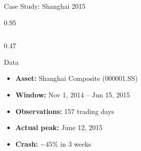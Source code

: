 \documentclass[9pt, aspectratio=169, t]{beamer}
\begin{document}
\begin{frame}{Case Study: Shanghai 2015}
    \begin{cminipage}{0.95\textwidth}
    {\footnotesize
    \begin{columns}[T]
        \begin{column}{0.47\textwidth}
            \begin{block}{Data}
                \begin{itemize}\setlength{\itemsep}{0pt}
                    \item \textbf{Asset:} Shanghai Composite (000001.SS)
                    \item \textbf{Window:} Nov 1, 2014 -- Jun 15, 2015
                    \item \textbf{Observations:} 157 trading days
                    \item \textbf{Actual peak:} June 12, 2015
                    \item \textbf{Crash:} $-45\%$ in 3 weeks
                \end{itemize}
            \end{block}


\end{column}
\end{columns}}
\end{cminipage}
\end{frame}
\end{document}

